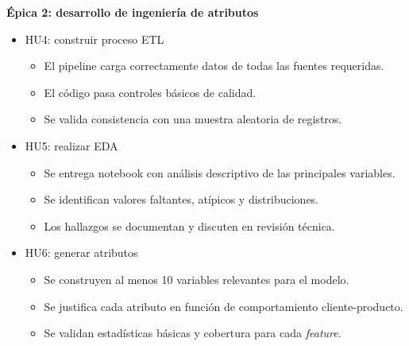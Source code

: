 \documentclass[
11pt, %
]{charter}
\begin{document}
\textbf{\'Epica 2: desarrollo de ingeniería de atributos}
\begin{itemize}
  \item HU4: construir proceso ETL
  \begin{itemize}
    \item El pipeline carga correctamente datos de todas las fuentes requeridas.
    \item El código pasa controles básicos de calidad.
    \item Se valida consistencia con una muestra aleatoria de registros.
  \end{itemize}
  \item HU5: realizar EDA
  \begin{itemize}
    \item Se entrega notebook con análisis descriptivo de las principales variables.
    \item Se identifican valores faltantes, atípicos y distribuciones.
    \item Los hallazgos se documentan y discuten en revisión técnica.
  \end{itemize}
  \item HU6: generar atributos
  \begin{itemize}
    \item Se construyen al menos 10 variables relevantes para el modelo.
    \item Se justifica cada atributo en función de comportamiento cliente-producto.
    \item Se validan estadísticas básicas y cobertura para cada \textit{feature}.
  \end{itemize}
\end{itemize}
\end{document}

